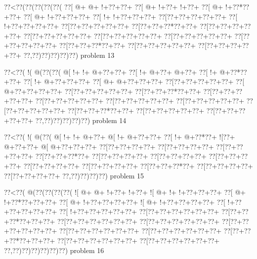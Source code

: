 \vbox{\vbox{\goo
\0??<\0??(\0??(\0??(\0??(\0??(
\0??[\- @+\- @+\- !+\0??+\0??+
\0??[\- @+\- !+\0??+\- !+\0??+
\0??[\- @+\- !+\0??*\0??+\0??+
\0??[\- @+\- !+\0??+\0??+\0??+
\0??[\- !+\- !+\0??+\0??+\0??+
\0??[\0??+\0??+\0??+\0??+\0??+
\0??[\- !+\0??+\0??+\0??+\0??+
\0??[\0??+\0??+\0??+\0??+\0??+
\0??[\0??+\0??+\0??*\0??+\0??+
\0??[\0??+\0??+\0??+\0??+\0??+
\0??[\0??+\0??+\0??+\0??+\0??+
\0??[\0??+\0??+\0??+\0??+\0??+
\0??[\0??+\0??+\0??+\0??+\0??+
\0??[\0??+\0??+\0??+\0??+\0??+
\0??[\0??+\0??+\0??*\0??+\0??+
\0??[\0??+\0??+\0??+\0??+\0??+
\0??[\0??+\0??+\0??+\0??+\0??+
\0??,\0??)\0??)\0??)\0??)\0??)
}
\hfil problem 13\hfil\break
}

\vbox{\vbox{\goo
\0??<\0??(\- !(\- @(\0??(\0??(
\- @[\- !+\- !+\- @+\0??+\0??+
\0??[\- !+\- @+\0??+\- @+\0??+
\0??[\- !+\- @+\0??*\0??+\0??+
\0??[\- !+\- @+\0??+\0??+\0??+
\0??[\- @+\- @+\0??+\0??+\0??+
\0??[\0??+\0??+\0??+\0??+\0??+
\0??[\- @+\0??+\0??+\0??+\0??+
\0??[\0??+\0??+\0??+\0??+\0??+
\0??[\0??+\0??+\0??*\0??+\0??+
\0??[\0??+\0??+\0??+\0??+\0??+
\0??[\0??+\0??+\0??+\0??+\0??+
\0??[\0??+\0??+\0??+\0??+\0??+
\0??[\0??+\0??+\0??+\0??+\0??+
\0??[\0??+\0??+\0??+\0??+\0??+
\0??[\0??+\0??+\0??*\0??+\0??+
\0??[\0??+\0??+\0??+\0??+\0??+
\0??[\0??+\0??+\0??+\0??+\0??+
\0??,\0??)\0??)\0??)\0??)\0??)
}
\hfil problem 14\hfil\break
}

\vbox{\vbox{\goo
\0??<\0??(\- !(\- @(\0??(
\- @[\- !+\- !+\- @+\0??+
\- @[\- !+\- @+\0??+\0??+
\0??[\- !+\- @+\0??*\0??+
\- ![\0??+\- @+\0??+\0??+
\- @[\- @+\0??+\0??+\0??+
\0??[\0??+\0??+\0??+\0??+
\0??[\0??+\0??+\0??+\0??+
\0??[\0??+\0??+\0??+\0??+
\0??[\0??+\0??+\0??*\0??+
\0??[\0??+\0??+\0??+\0??+
\0??[\0??+\0??+\0??+\0??+
\0??[\0??+\0??+\0??+\0??+
\0??[\0??+\0??+\0??+\0??+
\0??[\0??+\0??+\0??+\0??+
\0??[\0??+\0??+\0??*\0??+
\0??[\0??+\0??+\0??+\0??+
\0??[\0??+\0??+\0??+\0??+
\0??,\0??)\0??)\0??)\0??)
}
\hfil problem 15\hfil\break
}

\vbox{\vbox{\goo
\0??<\0??(\- @(\0??(\0??(\0??(\0??(
\- ![\- @+\- @+\- !+\0??+\- !+\0??+
\- ![\- @+\- !+\- !+\0??+\0??+\0??+
\0??[\- @+\- !+\0??*\0??+\0??+\0??+
\0??[\- @+\- !+\0??+\0??+\0??+\0??+
\- ![\- @+\- !+\0??+\0??+\0??+\0??+
\0??[\- !+\0??+\0??+\0??+\0??+\0??+
\0??[\- !+\0??+\0??+\0??+\0??+\0??+
\0??[\0??+\0??+\0??+\0??+\0??+\0??+
\0??[\0??+\0??+\0??*\0??+\0??+\0??+
\0??[\0??+\0??+\0??+\0??+\0??+\0??+
\0??[\0??+\0??+\0??+\0??+\0??+\0??+
\0??[\0??+\0??+\0??+\0??+\0??+\0??+
\0??[\0??+\0??+\0??+\0??+\0??+\0??+
\0??[\0??+\0??+\0??+\0??+\0??+\0??+
\0??[\0??+\0??+\0??*\0??+\0??+\0??+
\0??[\0??+\0??+\0??+\0??+\0??+\0??+
\0??[\0??+\0??+\0??+\0??+\0??+\0??+
\0??,\0??)\0??)\0??)\0??)\0??)\0??)
}
\hfil problem 16\hfil\break
}

